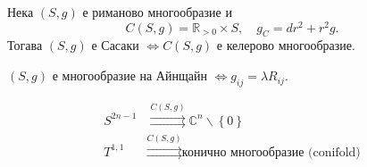 \documentclass[bulg]{beamer}
\begin{document}
  \begin{frame}
    \begin{definition}
      Нека $(S,g)$ е риманово многообразие и
        \begin{equation*}
          C(S,g) = \mathds{R}_{>0}\times S,\quad g_C =dr^2 + r^2g.
        \end{equation*}
        Тогава
        $(S,g)$ е Сасаки $\iff C(S,g)\text{ е келерово многообразие}$.
    \end{definition}%

    \begin{definition}
      $(S,g)$ е многообразие на Айнщайн $\iff g_{ij} = \lambda R_{ij}$.
    \end{definition}%

    \begin{examples}
      \begin{align*}
        S^{2n-1}&\overset{C(S,g)}{\rightrightarrows}\mathbb{C}^{n}\backslash\left\{0\right\}\\
        T^{1,1}&\overset{C(S,g)}{\rightrightarrows} \text{конично многообразие
         (conifold)}
      \end{align*}
    \end{examples}
  \end{frame}
\end{document}

